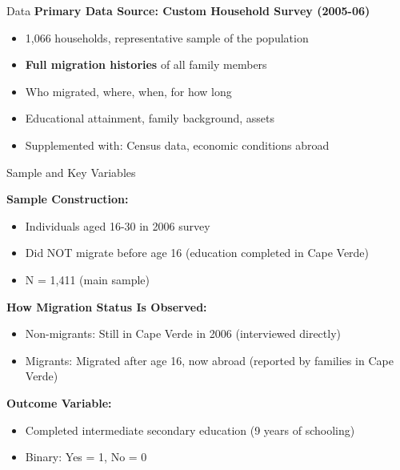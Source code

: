 \documentclass{beamer}
\begin{document}
\begin{frame}{Data}
\textbf{Primary Data Source: Custom Household Survey (2005-06)}
\begin{itemize}
    \item 1,066 households, representative sample of the population
    \item \textbf{Full migration histories} of all family members
    \item Who migrated, where, when, for how long
    \item Educational attainment, family background, assets
    \item Supplemented with: Census data, economic conditions abroad
\end{itemize}
\end{frame}

\begin{frame}{Sample and Key Variables}

\textbf{Sample Construction:}
\begin{itemize}
    \item Individuals aged 16-30 in 2006 survey
    \item Did NOT migrate before age 16 (education completed in Cape Verde)
    \item N = 1,411 (main sample)
\end{itemize}

\vspace{0.3cm}
\textbf{How Migration Status Is Observed:}
\begin{itemize}
    \item Non-migrants: Still in Cape Verde in 2006 (interviewed directly)
    \item Migrants: Migrated after age 16, now abroad (reported by families in Cape Verde)
\end{itemize}

\vspace{0.3cm}
\textbf{Outcome Variable:}
\begin{itemize}
    \item Completed intermediate secondary education (9 years of schooling)
    \item Binary: Yes = 1, No = 0
\end{itemize}
\end{frame}
\end{document}

